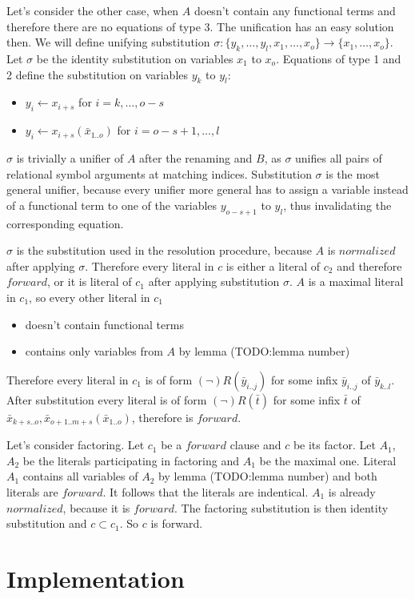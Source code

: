 \documentclass[english, shortabstract]{iithesis}
\theoremstyle{definition} \newtheorem{definition}{Definition}[chapter]
\theoremstyle{remark} \newtheorem{remark}[definition]{Observation}
\theoremstyle{plain} \newtheorem{theorem}[definition]{Theorem}
\theoremstyle{plain} \newtheorem{lemma}[definition]{Lemma}
\begin{document}
Let's consider the other case, when $A$ doesn't contain any functional terms and therefore there are no equations of type 3.
The unification has an easy solution then.%
We will define unifying substitution $\sigma : \{y_k,\dots,y_l, x_1, \dots, x_o\} \rightarrow \{x_1, \dots, x_o\}$.
Let $\sigma$ be the identity substitution on variables $x_1$ to $x_o$.
Equations of type 1 and 2 define the substitution on variables $y_k$ to $y_l$:
\begin{itemize}
    \item $y_i \leftarrow x_{i+s}$ for $i=k,\dots, o-s$
    \item $y_i \leftarrow x_{i+s}(\bar{x}_{1..o})$ for $i=o-s+1,\dots, l$
\end{itemize}
$\sigma$ is trivially a unifier of $A$ after the renaming and $B$, as
$\sigma$ unifies all pairs of relational symbol arguments at matching indices.
Substitution $\sigma$ is the most general unifier, because every unifier more general
has to assign a variable instead of a functional term to one of the variables $y_{o-s+1}$ to $y_l$, 
thus invalidating the corresponding equation. 

$\sigma$ is the substitution used in the resolution procedure, because $A$ is $normalized$ after applying $\sigma$.
Therefore every literal in $c$ is either a literal of $c_2$ and therefore $forward$, or it is 
literal of $c_1$ after applying substitution $\sigma$.
$A$ is a maximal literal in $c_1$, so every other literal in $c_1$ 
\begin{itemize}
    \item doesn't contain functional terms
    \item contains only variables from $A$ by lemma (TODO:lemma number)
\end{itemize}
Therefore every literal in $c_1$ is of form $(\lnot)R(\bar{y}_{i..j})$ for some infix $\bar{y}_{i..j}$ of $\bar{y}_{k..l}$.
After substitution every literal is of form $(\lnot)R(\bar{t})$ for some infix $\bar{t}$ of $\bar{x}_{k+s..o}, \bar{x}_{{o+1..m+s}}(\bar{x}_{1..o})$, therefore is $forward$.

\par Let's consider factoring. Let $c_1$ be a $forward$ clause and $c$ be its factor.
Let $A_1$, $A_2$ be the literals participating in factoring and $A_1$ be the maximal one.
Literal $A_1$ contains all variables of $A_2$ by lemma (TODO:lemma number) and both literals are $forward$. 
It follows that the literals are indentical. $A_1$ is already $normalized$, because it is $forward$.
The factoring substitution is then identity substitution and $c\subset c_1$. So $c$ is forward.

\chapter{Implementation}




\end{document}

